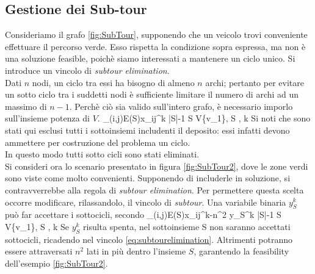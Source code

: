 \subsection{Gestione dei Sub-tour}
	Consideriamo il grafo \ref{fig:SubTour}, supponendo che un veicolo trovi conveniente effettuare il percorso verde. Esso rispetta la condizione sopra espressa,
	ma non è una soluzione feasible, poichè siamo interessati a mantenere un ciclo unico.
	Si introduce un vincolo di \emph{subtour elimination}.\\
	Dati $n$ nodi, un ciclo tra essi  ha bisogno di almeno $n$ archi; pertanto per evitare un sotto ciclo tra i suddetti nodi
	è sufficiente limitare il numero di archi ad un massimo di $n-1$. Perchè ciò sia valido sull'intero grafo,
	è necessario imporlo sull'insieme potenza di $V$.
		{\sum_{(i,j)\in E(S)}{x_{ij}^{k}} \leq |S|-1 \;\;\;\;\; 
		 S \subseteq V{\setminus}\{v_1\},\; S \neq \emptyset,\; k \in [1;K]}
	Si noti che sono stati qui esclusi tutti i sottoinsiemi includenti il deposito: essi infatti devono ammettere per costruzione del problema un ciclo.\\
	In questo modo tutti sotto cicli sono stati eliminati. \\Si consideri ora lo scenario presentato in figura \ref{fig:SubTour2}, dove le zone verdi 
	sono viste come molto convenienti. Supponendo di includerle in soluzione, si contravverrebbe alla regola di \emph{subtour elimination}.
	Per permettere questa scelta occorre modificare, rilassandolo, il vincolo di \emph{subtour}.
	Una variabile binaria $y_S^k$ può far accettare i sottocicli, secondo
		{\sum_{(i,j)\in E(S)}{x_{ij}^{k}-n^2 y_S^k} \leq |S|-1 \;\;\;\;\; 
		 S \subseteq V{\setminus}\{v_1\},\; S \neq \emptyset,\; k \in [1;K]}
	Se $y_S^k$ risulta spenta, nel sottoinsieme S non saranno accettati sottocicli, ricadendo nel vincolo \ref{eq:subtourelimination}. 
	Altrimenti potranno essere attraversati $n^2$ lati in più dentro l'insieme $S$, garantendo la feasibility dell'esempio \ref{fig:SubTour2}.
	
